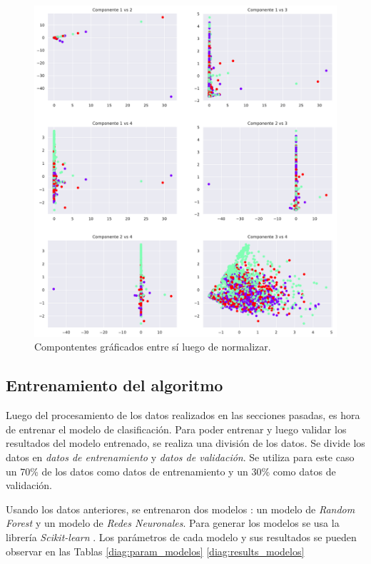 \begin{figure}[hbt!]
\centering
\includegraphics[width=\textwidth]{PCA_vs_normalizado.pdf}
\caption{Compontentes gráficados entre sí luego de normalizar.}
\label{fig:PCA_vs_normalizado}
\end{figure}

\subsection{Entrenamiento del algoritmo}

Luego del procesamiento de los datos realizados en las secciones pasadas, es hora de entrenar el modelo de clasificación. Para poder entrenar y luego validar los resultados del modelo entrenado, se realiza una división de los datos. Se divide los datos en \textit{datos de entrenamiento} y \textit{datos de validación}. Se utiliza para este caso un 70\% de los datos como datos de entrenamiento y un 30\% como datos de validación.

Usando los datos anteriores, se entrenaron dos modelos : un modelo de \textit{Random Forest} y un modelo de \textit{Redes Neuronales}. Para generar los modelos se usa la librería \textit{Scikit-learn} \cite{scikit-learn} \cite{sklearn_api}. Los parámetros de cada modelo y sus resultados se pueden observar en las Tablas \ref{diag:param_modelos} \ref{diag:results_modelos}



